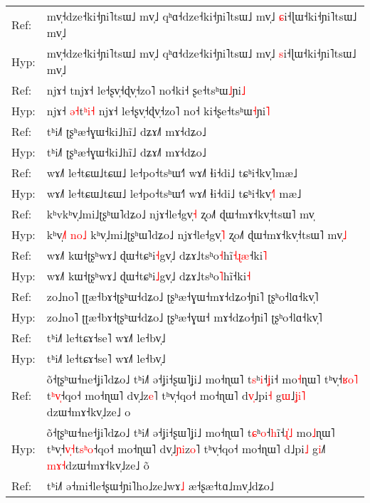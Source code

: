 \documentclass[10pt]{article}
\DeclareRobustCommand{\hl}[1]{{\textcolor{red}{#1}}}
\begin{document}
\begin{longtable}{ll}
\midrule 
Ref: & mv̩˧dze˧ki˧ɲi˥tsɯ˩ mv̩˩ qʰɑ˧dze˧ki˧ɲi˥tsɯ˩ mv̩˩ \hl{ɕ}i˧ɭɯ˧ki˧ɲi˥tsɯ˩ mv̩˩ \\ 
Hyp: & mv̩˧dze˧ki˧ɲi˥tsɯ˩ mv̩˩ qʰɑ˧dze˧ki˧ɲi˥tsɯ˩ mv̩˩ \hl{s}i˧ɭɯ˧ki˧ɲi˥tsɯ˩ mv̩˩ \\ 
\midrule 
Ref: & njɤ˧ tnjɤ˧ le˧ʂv̩˧ɖv̩˧zo˥ no˧ki˧\hl{ }ʂe˧tsʰɯ\hl{˩}ɲi\hl{˩} \\ 
Hyp: & njɤ˧ \hl{ə}\hl{˧}t\hl{ʰ}\hl{i}\hl{˧}\hl{ }njɤ˧ le˧ʂv̩˧ɖv̩˧zo˥ no˧\hl{ }ki˧ʂe˧tsʰɯ\hl{˧}ɲi\hl{˥} \\ 
\midrule 
Ref: & tʰi˩˥ ʈʂʰæ˧ɣɯ˧ki˩hĩ˩ dʑɤ˩˥ mɤ˧dʑo˩ \\ 
Hyp: & tʰi˩˥ ʈʂʰæ˧ɣɯ˧ki˩hĩ˩ dʑɤ˩˥ mɤ˧dʑo˩ \\ 
\midrule 
Ref: & wɤ˩˥ le˧tɕɯ˩tɕɯ˩ le˧po˧tsʰɯ˧˥ wɤ˩˥ ɬi˧di˩ tɕʰi˧kv̩˥mæ˩ \\ 
Hyp: & wɤ˩˥ le˧tɕɯ˩tɕɯ˩ le˧po˧tsʰɯ˧˥ wɤ˩˥ ɬi˧di˩ tɕʰi˧kv̩\hl{˧}˥\hl{ }mæ˩ \\ 
\midrule 
Ref: & kʰvkʰv̩˩mi˩ʈʂʰɯ˥dʑo˩ njɤ˧le˧gv̩\hl{˧} ʐo˩˥ ɖɯ˧mɤ˧kv̩˧tsɯ˥ mv̩ \\ 
Hyp: & kʰv\hl{̩}\hl{˩}\hl{˥}\hl{ }\hl{n}\hl{o}\hl{˩}\hl{ }kʰv̩˩mi˩ʈʂʰɯ˥dʑo˩ njɤ˧le˧gv̩\hl{˥} ʐo˩˥ ɖɯ˧mɤ˧kv̩˧tsɯ˥ mv̩\hl{˩} \\ 
\midrule 
Ref: & wɤ˩˥ kɯ˧ʈʂʰwɤ˩ ɖɯ˧tɕʰi\hl{˧}gv̩˩ dʑɤ˩tsʰo\hl{˧}hĩ\hl{˧}\hl{ɻ}\hl{æ}˧ki\hl{˥} \\ 
Hyp: & wɤ˩˥ kɯ˧ʈʂʰwɤ˩ ɖɯ˧tɕʰi\hl{˩}gv̩˩ dʑɤ˩tsʰo\hl{˥}hĩ˧ki\hl{˧} \\ 
\midrule 
Ref: & zo˩no˥ ʈʈæ˧bɤ˧ʈʂʰɯ˧dʑo˩ ʈʂʰæ˧ɣɯ˧mɤ˧dʑo˧ɲi˥ ʈʂʰo˧lɑ˧kv̩˥ \\ 
Hyp: & zo˩no˥ ʈʈæ˧bɤ˧ʈʂʰɯ˧dʑo˩ ʈʂʰæ˧ɣɯ˧\hl{ }mɤ˧dʑo˧ɲi˥ ʈʂʰo˧lɑ˧kv̩˥ \\ 
\midrule 
Ref: & tʰi˩˥ le˧tɕɤ˧se˥ wɤ˩˥ le˧bv̩˩ \\ 
Hyp: & tʰi˩˥ le˧tɕɤ˧se˥ wɤ˩˥ le˧bv̩˩ \\ 
\midrule 
Ref: & õ˧ʈʂʰɯ˧ne˧ʝi˥dʑo˩ tʰi˩˥ ə˧ʝi˧ʂɯ˥ʝi˩ mo˧ɳɯ˥ t\hl{s}ʰ\hl{i}˧\hl{ʝ}i˧ mo\hl{˧}ɳɯ˥ tʰv̩˧\hl{ʁ}\hl{o}\hl{˥}\hl{ }t\hl{ʰ}\hl{v}\hl{̩}˧qo˧ mo˧ɳɯ˥ dv̩˩z\hl{e}˥ tʰv̩˧qo˧ mo˧ɳɯ˥ d\hl{v}\hl{̩}˩pi\hl{˧} g\hl{ɯ}˩\hl{ʝ}\hl{i}\hl{˥}\hl{ }dzɯ˧mɤ˧kv̩˩ze˩ o \\ 
Hyp: & õ˧ʈʂʰɯ˧ne˧ʝi˥dʑo˩ tʰi˩˥ ə˧ʝi˧ʂɯ˥ʝi˩ mo˧ɳɯ˥ t\hl{ɕ}ʰ\hl{o}˧\hl{h}i\hl{̃}˧\hl{ɻ}\hl{̍}\hl{˩} mo\hl{˩}ɳɯ˥ tʰv̩˧\hl{v}\hl{̩}\hl{˧}t\hl{s}\hl{ʰ}\hl{o}˧qo˧ mo˧ɳɯ˥ dv̩˩\hl{ɲ}\hl{i}z\hl{o}˥ tʰv̩˧qo˧ mo˧ɳɯ˥ d˩pi\hl{˩} g\hl{i}˩\hl{˥}\hl{ }\hl{m}\hl{ɤ}\hl{˧}dzɯ˧mɤ˧kv̩˩ze˩ o\hl{̃} \\ 
\midrule 
Ref: & tʰi˩˥ ə˧mi˧le˧ʂɯ˧ɲi˥ho˩ze˩wɤ\hl{˩} æ˧ʂæ˧tɑ˩mv̩˩dʑo˩ \\ 

\end{longtable}
\end{document}
